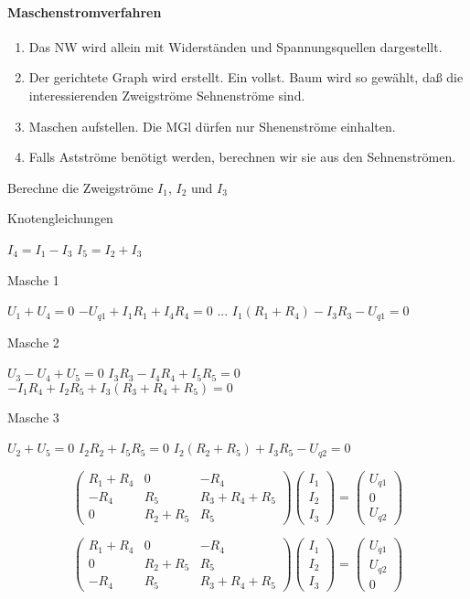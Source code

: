 \documentclass[german]{article}
\begin{document}
\paragraph{Maschenstromverfahren}
	\begin{enumerate}
		\item Das NW wird allein mit Widerständen und Spannungsquellen dargestellt.
		\item Der gerichtete Graph wird erstellt. Ein vollst. Baum wird so gewählt, daß die interessierenden Zweigströme Sehnenströme sind.
		\item Maschen aufstellen. Die MGl dürfen nur Shenenströme einhalten.
		\item Falls Astströme benötigt werden, berechnen wir sie aus den Sehnenströmen.
	\end{enumerate}


Berechne die Zweigströme $I_1$, $I_2$ und $I_3$

Knotengleichungen

$I_4 = I_1 - I_3$
$I_5 = I_2 + I_3$

Masche 1

$U_1 + U_4 = 0$
$-U_{q1} + I_1 R_1 + I_4 R_4 = 0$
...
$I_1(R_1 + R_4) - I_3 R_3 - U_{q1} = 0$

Masche 2

$U_3 - U_4 + U_5 = 0$
$I_3 R_3 - I_4 R_4 + I_5 R_5 = 0$
$-I_1 R_4 + I_2 R_5 + I_3(R_3 + R_4 + R_5) = 0$

Masche 3

$U_2 + U_5 = 0$
$I_2 R_2 + I_5 R_5 = 0$
$I_2 ( R_2 + R_5 ) + I_3 R_5 - U_{q2} = 0$

\[
	\begin{pmatrix}
		R_1 + R_4 & 0 & -R_4 \\
		-R_4 & R_5 & R_3 + R_4 + R_5 \\
		0 & R_2 + R_5 & R_5
	\end{pmatrix}
	\begin{pmatrix}
		I_1 \\
		I_2 \\
		I_3
	\end{pmatrix}
	=
	\begin{pmatrix}
		U_{q1} \\
		0 \\
		U_{q2}
	\end{pmatrix}
\]

\[
	\begin{pmatrix}
		R_1 + R_4 & 0 & -R_4 \\
		0 & R_2 + R_5 & R_5 \\
		-R_4 & R_5 & R_3 + R_4 + R_5
	\end{pmatrix}
	\begin{pmatrix}
		I_1 \\
		I_2 \\
		I_3
	\end{pmatrix}
	=
	\begin{pmatrix}
		U_{q1} \\
		U_{q2} \\
		0
	\end{pmatrix}
\]
\end{document}
